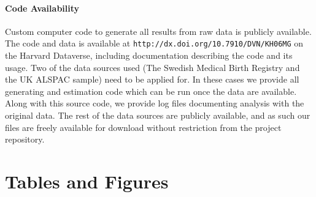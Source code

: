 \documentclass[11pt]{article}
\begin{document}
\paragraph{Code Availability}
Custom computer code to generate all results from raw data is publicly available. The code and data is available at \texttt{http://dx.doi.org/10.7910/DVN/KH06MG} on the Harvard Dataverse, including documentation describing the code and its usage. Two of the data sources used (The Swedish Medical Birth Registry and the UK ALSPAC sample) need to be applied for. In these cases we provide all generating and estimation code which can be run once the data are available. Along with this source code, we provide log files documenting analysis with the original data.  The rest of the data sources are publicly available, and as such our files are freely available for download without restriction from the project repository.









\section*{Tables and Figures}

\clearpage
\end{document}
